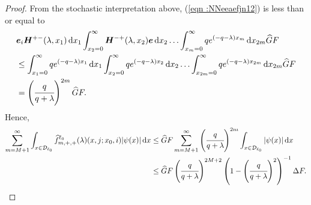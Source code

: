 \begin{proof}
	From the stochastic interpretation above, (\ref{eqn :NNeeaefjn12}) is less than or equal to 
	\begin{align}
	&\boldsymbol e_i \boldsymbol H^{+-}(\lambda,x_1) \, \mathrm{d} x_1 \int_{x_2=0}^\infty \boldsymbol H^{-+}(\lambda,x_2) \boldsymbol e \, \mathrm{d} x_2  
				\hdots \int_{x_m=0}^\infty qe^{(-q-\lambda)x_m}\, \mathrm{d} x_{2m}\widehat GF\nonumber
	\\&\leq \int_{x_1=0}^\infty qe^{(-q-\lambda)x_1}  \, \mathrm{d} x_1 \int_{x_2=0}^\infty qe^{(-q-\lambda)x_2}  \, \mathrm{d} x_2  
				\hdots \int_{x_{2m}=0}^\infty qe^{(-q-\lambda)x_{2m}}\, \mathrm{d} x_{2m}\widehat GF \nonumber
	\\&= \left(\cfrac{q}{q+\lambda}\right)^{2m}\widehat GF.\label{eqn: bound ggggaaaa}
	\end{align}
	Hence,  
	\begin{align}
		\sum_{m=M+1}^\infty \int_{x\in\mathcal{D}_{\ell_0}} \widehat f^{\ell_0}_{m,+,+}(\lambda)(x,j;x_0,i)|\psi(x)|\, \mathrm{d} x \nonumber
		&\leq  \widehat GF  \sum_{m=M+1}^\infty \left(\cfrac{q}{q+\lambda}\right)^{2m}\int_{x\in\mathcal{D}_{\ell_0}} |\psi(x)|\, \mathrm{d} x \nonumber
		\\&\leq \widehat GF \left(\cfrac{q}{q+\lambda}\right)^{2M+2} \left(1-\left(\cfrac{q}{q+\lambda}\right)^2\right)^{-1} \Delta F.
	\end{align}
	

\end{proof}

